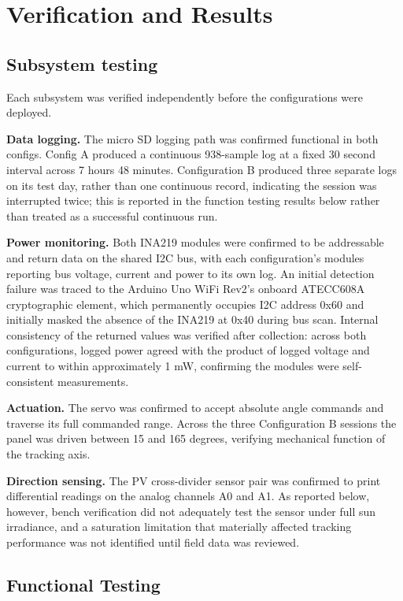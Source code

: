 \documentclass[journal]{IEEEtran}
\begin{document}
\section{Verification and Results}

\subsection{Subsystem testing}

Each subsystem was verified independently before the configurations were deployed.

\textbf{Data logging.} The micro SD logging path was confirmed functional in both
configs. Config A produced a continuous 938-sample log at a fixed 30 second interval
across 7 hours 48 minutes. Configuration B produced three separate logs on its test
day, rather than one continuous record, indicating the session was interrupted twice;
this is reported in the function testing results below rather than treated as a
successful continuous run.

\textbf{Power monitoring.} Both INA219 modules were confirmed to be addressable and
return data on the shared I2C bus, with each configuration's modules reporting bus
voltage, current and power to its own log. An initial detection failure was traced to
the Arduino Uno WiFi Rev2's onboard ATECC608A cryptographic element, which permanently
occupies I2C address 0x60 and initially masked the absence of the INA219 at 0x40 during
bus scan. Internal consistency of the returned values was verified after collection:
across both configurations, logged power agreed with the product of logged voltage and
current to within approximately 1 mW, confirming the modules were self-consistent
measurements.

\textbf{Actuation.} The servo was confirmed to accept absolute angle commands and
traverse its full commanded range. Across the three Configuration B sessions the panel
was driven between 15 and 165 degrees, verifying mechanical function of the tracking
axis.

\textbf{Direction sensing.} The PV cross-divider sensor pair was confirmed to print
differential readings on the analog channels A0 and A1. As reported below, however,
bench verification did not adequately test the sensor under full sun irradiance, and a
saturation limitation that materially affected tracking performance was not identified
until field data was reviewed.

\subsection{Functional Testing}
\end{document}
